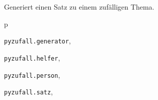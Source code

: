 \documentclass[a4paper,12pt,oneside]{sphinxmanual}
\begin{document}

\begin{fulllineitems}
\label{module:pyzufall.satz.satz_thema}
Generiert einen Satz zu einem zufälligen Thema.

\end{fulllineitems}



\renewcommand{\indexname}{Python-Modulindex}
\begin{theindex}
\def\bigletter#1{{\Large\sffamily#1}\nopagebreak\vspace{1mm}}
\bigletter{p}
\item {\texttt{pyzufall.generator}}, \pageref{module:module-pyzufall.generator}
\item {\texttt{pyzufall.helfer}}, \pageref{module:module-pyzufall.helfer}
\item {\texttt{pyzufall.person}}, \pageref{module:module-pyzufall.person}
\item {\texttt{pyzufall.satz}}, \pageref{module:module-pyzufall.satz}
\end{theindex}

\renewcommand{\indexname}{Stichwortverzeichnis}
\printindex
\end{document}
